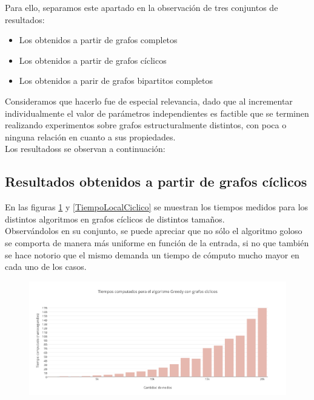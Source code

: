 Para ello, separamos este apartado en la observación de tres conjuntos de resultados:

\begin{itemize}
\item {Los obtenidos a partir de grafos completos}
\item {Los obtenidos a partir de grafos cíclicos}
\item {Los obtenidos a parir de grafos bipartitos completos}
\end{itemize}

Consideramos que hacerlo fue de especial relevancia, dado que al incrementar individualmente el valor de parámetros independientes es factible que se terminen realizando experimentos sobre grafos estructuralmente distintos, con poca o ninguna relación en cuanto a sus propiedades.\\
Los resultadoss se observan a continuación:\\


\subsection {Resultados obtenidos a partir de grafos cíclicos}

En las figuras \ref{TiempoGreedyCiclico} y \ref{TiempoLocalCiclico} se muestran los tiempos medidos para los distintos algoritmos en grafos cíclicos de distintos tamaños. \\
Observándolos en su conjunto, se puede apreciar que no sólo el algoritmo goloso se comporta de manera más uniforme en función de la entrada, si no que también se hace notorio que el mismo demanda un tiempo de cómputo mucho mayor en cada uno de los casos.\\

\begin{figure}[H]
    \centering
  	\includegraphics[width=18cm]{imagenes/Ej5/TiempoGreedyCiclico.png}
    \caption{}
 	  \label{TiempoGreedyCiclico}
  \end{figure}

